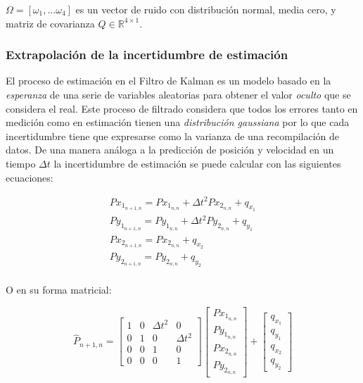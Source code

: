 $\Omega = [\omega_1, ... \omega_4]$ es un vector de ruido con distribución normal, media cero, y matriz de covarianza $Q\in \mathbb{R}^{4\times 1}$.

		\subsubsection*{Extrapolación de la incertidumbre de estimación}
	El proceso de estimación en el Filtro de Kalman es un modelo basado en la \textit{esperanza} de una serie de variables aleatorias para obtener el valor \textit{oculto} que se considera el real. Este proceso de filtrado considera que todos los errores tanto en medición como en estimación tienen una \textit{distribución gaussiana} por lo que cada incertidumbre tiene que expresarse como la varianza de una recompilación de datos. De una manera análoga a la predicción de posición y velocidad en un tiempo $\Delta t$ la incertidumbre de estimación se puede calcular con las siguientes ecuaciones:

\begin{eqnarray*}
	Px_{1_{n+1,n}} = Px_{1_{n,n}} + \Delta t^{2} Px_{2_{n,n}} + q_{x_1}\\
	Py_{1_{n+1,n}} = Py_{1_{n,n}} + \Delta t^{2} Py_{2_{n,n}} + q_{y_1}\\
	Px_{2_{n+1,n}} = Px_{2_{n,n}} 				    		  + q_{x_2}\\
	Py_{2_{n+1,n}} = Py_{2_{n,n}}							  + q_{y_2}\\
\end{eqnarray*}

O en su forma matricial:

\begin{equation}
\hat{P}_{n+1,n} =
\begin{bmatrix}
1 & 0 & \Delta t^{2} & 0 \\ 
0 & 1 & 0 & \Delta t^{2} \\
0 & 0 & 1 & 0\\
0 & 0 & 0 & 1
\end{bmatrix}
\begin{bmatrix}
Px_{1_{n,n}}\\ 
Py_{1_{n,n}}\\
Px_{2_{n,n}}\\
Py_{2_{n,n}}
\end{bmatrix}
+
\begin{bmatrix}
q_{x_1}\\ 
q_{y_1}\\
q_{x_2}\\
q_{y_2}
\end{bmatrix}
\end{equation}


